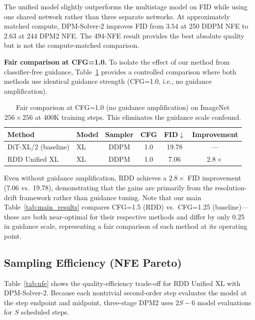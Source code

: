 \documentclass[10pt]{article}
\begin{document}
The unified model slightly outperforms the multistage model on FID while using one shared network rather than three separate networks.
At approximately matched compute, DPM-Solver-2 improves FID from $3.54$ at 250 DDPM NFE to $2.63$ at 244 DPM2 NFE.
The 494-NFE result provides the best absolute quality but is not the compute-matched comparison.

\textbf{Fair comparison at CFG=1.0.}
To isolate the effect of our method from classifier-free guidance, Table~\ref{tab:fair_cfg1} provides a controlled comparison where both methods use identical guidance strength (CFG=1.0, i.e., no guidance amplification).

\begin{table}[t]
\centering
\caption{Fair comparison at CFG=1.0 (no guidance amplification) on ImageNet $256\times256$ at 400K training steps. This eliminates the guidance scale confound.}
\label{tab:fair_cfg1}
\begin{tabular}{@{}llcccc@{}}
\toprule
\textbf{Method} & \textbf{Model} & \textbf{Sampler} & \textbf{CFG} & \textbf{FID}$\downarrow$ & \textbf{Improvement} \\
\midrule
DiT-XL/2 (baseline) & XL & DDPM & 1.0 & 19.78 & --- \\
RDD Unified XL & XL & DDPM & 1.0 & 7.06 & $2.8\times$ \\
\bottomrule
\end{tabular}
\end{table}

Even without guidance amplification, RDD achieves a $2.8\times$ FID improvement (7.06 vs.\ 19.78), demonstrating that the gains are primarily from the resolution-drift framework rather than guidance tuning.
Note that our main Table~\ref{tab:main_results} compares CFG=1.5 (RDD) vs.\ CFG=1.25 (baseline)---these are both near-optimal for their respective methods and differ by only 0.25 in guidance scale, representing a fair comparison of each method at its operating point.

\subsection{Sampling Efficiency (NFE Pareto)}
\label{sec:efficiency}

Table~\ref{tab:nfe} shows the quality-efficiency trade-off for RDD Unified XL with DPM-Solver-2.
Because each nontrivial second-order step evaluates the model at the step endpoint and midpoint, three-stage DPM2 uses $2S-6$ model evaluations for $S$ scheduled steps.
\end{document}
